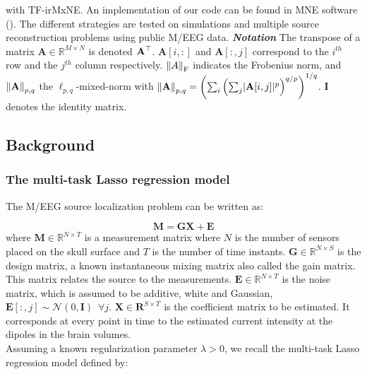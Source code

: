 with TF-irMxNE. An implementation of our code can be found in MNE software (\cite{mne}).
The different strategies are tested on simulations and multiple source reconstruction 
problems using public M/EEG data.
%
\newline
\newline
%
\textit{\textbf{Notation}} The transpose of a matrix $\mathbf{A} \in \mathbb{R}^{M \times N}$ is
denoted $\bf{A}^\top$. $\mathbf{A}[i,:]$ and $\mathbf{A}[:,j]$ correspond to the $i^{th}$
row and the $j^{th}$ column respectively. $\left \lVert A \right \rVert_{\text{F}}$ indicates the Frobenius norm,
and $\left \lVert \mathbf{A} \right \rVert_{p,q}$ the $\ell_{p,q}$-mixed-norm with $\left \lVert \mathbf{A} \right \rVert_{p,q} 
= \left(\sum_i \left(\sum_j \lvert \mathbf{A}[i,j] \rvert^p\right)^{q/p}\right)^{1/q}$.
$\mathbf{I}$ denotes the identity matrix.


\subsection{Background}
\label{sub:background}
%

\subsubsection{The multi-task Lasso regression model}

The M/EEG source localization problem can be written as:

\begin{equation}
    \mathbf{M = GX + E}
\end{equation}
%
where $\mathbf{M} \in \mathbb{R}^{N \times T}$ is a measurement matrix where $N$ is the
number of sensors placed on the skull surface and $T$ is the number of time instants.
$\mathbf{G} \in \mathbb{R}^{N \times S}$ is the design matrix, a known 
instantaneous mixing matrix also called the gain matrix. This matrix relates the source
to the measurements. $\mathbf{E} \in \mathbb{R}^{N \times T}$ is the noise matrix, which
is assumed to be additive, white and Gaussian, $\mathbf{E}[:,j] \sim \mathcal{N}(0, \mathbf{I})
\enspace \forall j$. $\mathbf{X} \in \mathbf{R}^{S \times T}$ is the coefficient matrix to be estimated. 
It corresponds at every point in time to the estimated current intensity at the dipoles in
the brain volumes.
\\
Assuming a known regularization parameter $\lambda > 0$, we recall the multi-task
Lasso regression model defined by:

